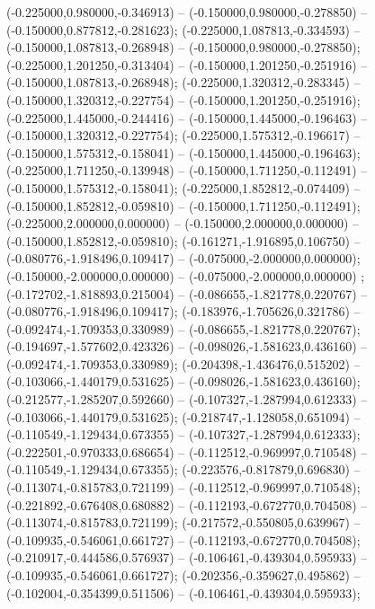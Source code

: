  (-0.225000,0.980000,-0.346913) -- (-0.150000,0.980000,-0.278850) -- (-0.150000,0.877812,-0.281623);
 (-0.225000,1.087813,-0.334593) -- (-0.150000,1.087813,-0.268948) -- (-0.150000,0.980000,-0.278850);
 (-0.225000,1.201250,-0.313404) -- (-0.150000,1.201250,-0.251916) -- (-0.150000,1.087813,-0.268948);
 (-0.225000,1.320312,-0.283345) -- (-0.150000,1.320312,-0.227754) -- (-0.150000,1.201250,-0.251916);
 (-0.225000,1.445000,-0.244416) -- (-0.150000,1.445000,-0.196463) -- (-0.150000,1.320312,-0.227754);
 (-0.225000,1.575312,-0.196617) -- (-0.150000,1.575312,-0.158041) -- (-0.150000,1.445000,-0.196463);
 (-0.225000,1.711250,-0.139948) -- (-0.150000,1.711250,-0.112491) -- (-0.150000,1.575312,-0.158041);
 (-0.225000,1.852812,-0.074409) -- (-0.150000,1.852812,-0.059810) -- (-0.150000,1.711250,-0.112491);
 (-0.225000,2.000000,0.000000) -- (-0.150000,2.000000,0.000000) -- (-0.150000,1.852812,-0.059810);
 (-0.161271,-1.916895,0.106750) -- (-0.080776,-1.918496,0.109417) -- (-0.075000,-2.000000,0.000000);
 (-0.150000,-2.000000,0.000000) -- (-0.075000,-2.000000,0.000000) ;
 (-0.172702,-1.818893,0.215004) -- (-0.086655,-1.821778,0.220767) -- (-0.080776,-1.918496,0.109417);
 (-0.183976,-1.705626,0.321786) -- (-0.092474,-1.709353,0.330989) -- (-0.086655,-1.821778,0.220767);
 (-0.194697,-1.577602,0.423326) -- (-0.098026,-1.581623,0.436160) -- (-0.092474,-1.709353,0.330989);
 (-0.204398,-1.436476,0.515202) -- (-0.103066,-1.440179,0.531625) -- (-0.098026,-1.581623,0.436160);
 (-0.212577,-1.285207,0.592660) -- (-0.107327,-1.287994,0.612333) -- (-0.103066,-1.440179,0.531625);
 (-0.218747,-1.128058,0.651094) -- (-0.110549,-1.129434,0.673355) -- (-0.107327,-1.287994,0.612333);
 (-0.222501,-0.970333,0.686654) -- (-0.112512,-0.969997,0.710548) -- (-0.110549,-1.129434,0.673355);
 (-0.223576,-0.817879,0.696830) -- (-0.113074,-0.815783,0.721199) -- (-0.112512,-0.969997,0.710548);
 (-0.221892,-0.676408,0.680882) -- (-0.112193,-0.672770,0.704508) -- (-0.113074,-0.815783,0.721199);
 (-0.217572,-0.550805,0.639967) -- (-0.109935,-0.546061,0.661727) -- (-0.112193,-0.672770,0.704508);
 (-0.210917,-0.444586,0.576937) -- (-0.106461,-0.439304,0.595933) -- (-0.109935,-0.546061,0.661727);
 (-0.202356,-0.359627,0.495862) -- (-0.102004,-0.354399,0.511506) -- (-0.106461,-0.439304,0.595933);

